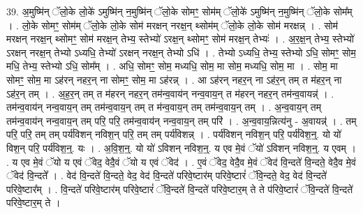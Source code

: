 \documentclass[17pt]{extarticle}
\begin{document}
39. अ॒मुष्मि॑न् ॅलो॒के लो॒के॑ ऽमुष्मि॑न् न॒मुष्मि॑न् ॅलो॒के सोमꣳ॒॒ सोम॑म् ॅलो॒के॑ ऽमुष्मि॑न् न॒मुष्मि॑न् ॅलो॒के सोम᳚म् । . लो॒के सोमꣳ॒॒ सोम॑म् ॅलो॒के लो॒के सोम॑ मरक्षन् नरक्ष॒न् थ्सोम॑म् ॅलो॒के लो॒के सोम॑ मरक्षन्न् । . सोम॑ मरक्षन् नरक्ष॒न् थ्सोमꣳ॒॒ सोम॑ मरक्ष॒न् तेभ्य॒ स्तेभ्यो॑ ऽरक्ष॒न् थ्सोमꣳ॒॒ सोम॑ मरक्ष॒न् तेभ्यः॑ । . अ॒र॒क्ष॒न् तेभ्य॒ स्तेभ्यो॑ ऽरक्षन् नरक्ष॒न् तेभ्यो ऽध्यधि॒ तेभ्यो॑ ऽरक्षन् नरक्ष॒न् तेभ्यो ऽधि॑ । . तेभ्यो ऽध्यधि॒ तेभ्य॒ स्तेभ्यो ऽधि॒ सोमꣳ॒॒ सोम॒ मधि॒ तेभ्य॒ स्तेभ्यो ऽधि॒ सोम᳚म् । . अधि॒ सोमꣳ॒॒ सोम॒ मध्यधि॒ सोम॒ मा सोम॒ मध्यधि॒ सोम॒ मा । . सोम॒ मा सोमꣳ॒॒ सोम॒ मा ऽह॑रन् नहर॒न् ना सोमꣳ॒॒ सोम॒ मा ऽह॑रन्न् । . आ ऽह॑रन् नहर॒न् ना ऽह॑र॒न् तम् त म॑हर॒न् ना ऽह॑र॒न् तम् । . अ॒ह॒र॒न् तम् त म॑हरन् नहर॒न् तम॑न्व॒वाय॑न् नन्व॒वाय॒न् त म॑हरन् नहर॒न् 
तम॑न्व॒वायन्न्॑ । . तम॑न्व॒वाय॑न् नन्व॒वाय॒न् तम् तम॑न्व॒वाय॒न् तम् त म॑न्व॒वाय॒न् तम् तम॑न्व॒वाय॒न् तम् । . अ॒न्व॒वाय॒न् तम् तम॑न्व॒वाय॑न् नन्व॒वाय॒न् तम् परि॒ परि॒ तम॑न्व॒वाय॑न् नन्व॒वाय॒न् तम् परि॑ । . अ॒न्व॒वाय॒न्नित्य॑नु - अ॒वायन्न्॑ । . तम् परि॒ परि॒ तम् तम् पर्य॑विशन् नविश॒न् परि॒ तम् तम् पर्य॑विशन्न् । . पर्य॑विशन् नविश॒न् परि॒ पर्य॑विश॒न्॒. यो यो॑ विश॒न् परि॒ पर्य॑विश॒न्॒. यः । . अ॒वि॒श॒न्॒. यो यो॑ ऽविशन् नविश॒न्॒. य एव मे॒वं ॅयो॑ ऽविशन् नविश॒न्॒. य एवम् । . य एव मे॒वं ॅयो य एवं ॅवेद॒ वेदै॒वं ॅयो य एवं ॅवेद॑ । . ए॒वं ॅवेद॒ वेदै॒व मे॒वं ॅवेद॑ वि॒न्दते॑ वि॒न्दते॒ वेदै॒व मे॒वं ॅवेद॑ वि॒न्दते᳚ । . वेद॑ वि॒न्दते॑ वि॒न्दते॒ वेद॒ वेद॑ वि॒न्दते॑ परिवे॒ष्टार॑म् परिवे॒ष्टारं॑ ॅवि॒न्दते॒ वेद॒ वेद॑ वि॒न्दते॑ परिवे॒ष्टार᳚म् । . वि॒न्दते॑ परिवे॒ष्टार॑म् परिवे॒ष्टारं॑ ॅवि॒न्दते॑ वि॒न्दते॑ परिवे॒ष्टार॒म् ते ते प॑रिवे॒ष्टारं॑ ॅवि॒न्दते॑ वि॒न्दते॑ परिवे॒ष्टार॒म् ते । \newline
\pagebreak
{}
\end{document}
